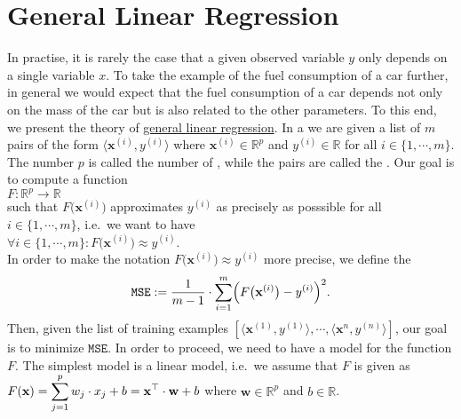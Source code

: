 \section{General Linear Regression}
In practise, it is rarely the case that a given observed variable $y$ only depends on a single variable $x$.
To take the example of the fuel consumption of a car further, in general we would expect that the fuel consumption
of a car depends not only on the mass of the car but is also related to the other parameters.  
To this end, we present the theory of   
\href{https://en.wikipedia.org/wiki/Linear_regression}{general linear regression}.
In a  we are given a list of $m$ pairs of the form $\langle\mathbf{x}^{(i)}, y^{(i)} \rangle$ 
where $\mathbf{x}^{(i)} \in \mathbb{R}^p$ and $y^{(i)} \in \mathbb{R}$ for all $i \in \{1,\cdots,m\}$.  The
number $p$ is called the number of , while the pairs are called the .
Our goal is to compute a function 
\\[0.2cm]
\hspace*{1.3cm}
$F:\mathbb{R}^p \rightarrow \mathbb{R}$
\\[0.2cm]  
such that $F\bigl(\mathbf{x}^{(i)}\bigr)$ approximates  $y^{(i)}$ as precisely as posssible
for all $i\in\{1,\cdots,m\}$, i.e.~we want to have
\\[0.2cm]
\hspace*{1.3cm}
$\forall i\in\{1,\cdots,m\}:F\bigl(\mathbf{x}^{(i)}\bigr) \approx y^{(i)}$.
\\[0.2cm]
In order to make the notation $F\bigl(\mathbf{x}^{(i)}\bigr) \approx y^{(i)}$ more precise, we
define the  
\begin{equation}
  \label{eq:squared-error-1}
  \mathtt{MSE} := \frac{1}{m-1} \cdot \sum\limits_{i=1}^{m} \Bigl(F\bigl(\mathbf{x}^{(i)}\bigr) - y^{(i)}\Bigr)^2. 
\end{equation}
Then, given the list of training examples $[\langle \mathbf{x}^{(1)}, y^{(1)} \rangle, \cdots, \langle
\mathbf{x}^{n}, y^{(n)} \rangle]$, our goal is to minimize $\mathtt{MSE}$.  
In order to proceed, we need to have a model for the function $F$.  The simplest model is a linear
model, i.e.~we assume that $F$ is given as 
\\[0.2cm]
\hspace*{1.3cm}
$\displaystyle F(\mathbf{x}) = \sum\limits_{j=1}^p w_j \cdot x_j + b = \mathbf{x}^\top \cdot \mathbf{w} + b$ \quad where $\mathbf{w} \in \mathbb{R}^p$ and $b\in\mathbb{R}$.
\\[0.2cm]
